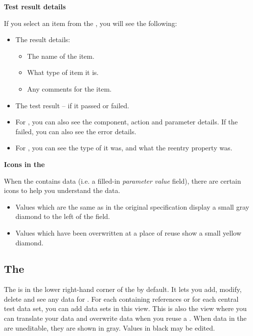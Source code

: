 \textbf{Test result details}

If you select an item from the \gdtestresultview{}, you will see the following:
\begin{itemize}
\item The result details:
\begin{itemize}
\item The name of the item.
\item What type of item it is.
\item Any comments for the item.
\end{itemize}
\item The test result -- if it passed or failed.
\item For \gdsteps{}, you can also see the component, action and parameter details. If the \gdstep{} failed, you can also see the error details. 
\item For \gdehandlers{}, you can see the type of \gdehandler{} it was, and what the reentry property was. 
\end{itemize}

 
\textbf{Icons in the \gdpropview{}}

When the \gdpropview{} contains data (i.e. a filled-in \emph{parameter value} field), there are certain icons to help you understand the data.  
\begin{itemize}
\item Values which are the same as in the original specification display 
a small gray diamond to the left of the field.
\item Values which have been overwritten at a place of reuse show a small 
yellow diamond. 
\end{itemize}


\subsection{The \gddatasetsview{}}
The \gddatasetsview{} is in the lower right-hand corner of the \specpersp{}  by default. It lets you add, modify, delete and see any data for \gdcases{}. For each \gdcase{} containing references or for each central test data set, you can add data sets in this view. This is also the view where you can translate your data and overwrite data when you reuse a \gdcase{}. 
 When data in the \gddatasetsview are uneditable, they are shown in gray. Values in black may be edited.

